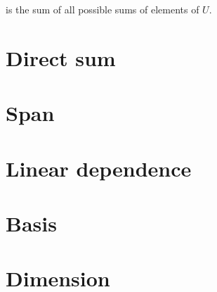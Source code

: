 \documentclass{article}
\begin{document}
is the sum of all possible sums of elements of $U$.

\section{Direct sum}

\section{Span}

\section{Linear dependence}

\section{Basis}

\section{Dimension}
\end{document}
